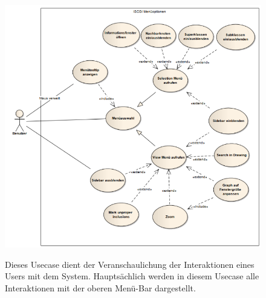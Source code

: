 \documentclass[11pt,a4paper]{article}
\begin{document}
\begin{figure}[htp]
	\begin{center}
		\includegraphics[width=13cm]{Menueoptionen.PNG}\\
	\end{center}
	\caption{Dieses Usecase dient der Veranschaulichung der Interaktionen eines Users mit dem System. Hauptsächlich werden in diesem Usecase alle Interaktionen mit der oberen Menü-Bar dargestellt.}
	\label{fig:figure1}
\end{figure}
\newpage
\end{document}
